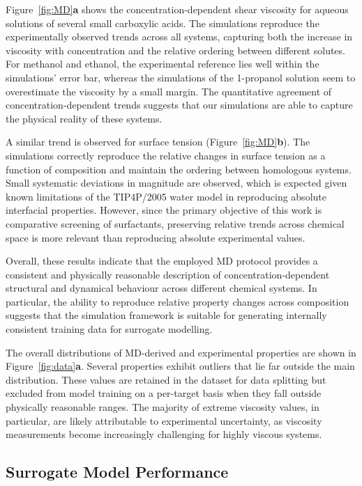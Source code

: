 \documentclass[letterpaper]{article}
\begin{document}
Figure~\ref{fig:MD}\textbf{a} shows the concentration-dependent shear viscosity for aqueous solutions of several small carboxylic acids. The simulations reproduce the experimentally observed trends across all systems, capturing both the increase in viscosity with concentration and the relative ordering between different solutes. For methanol and ethanol, the experimental reference lies well within the simulations' error bar, whereas the simulations of the 1-propanol solution seem to overestimate the viscosity by a small margin. The quantitative agreement of concentration-dependent trends suggests that our simulations are able to capture the physical reality of these systems.

A similar trend is observed for surface tension (Figure~\ref{fig:MD}\textbf{b}). The simulations correctly reproduce the relative changes in surface tension as a function of composition and maintain the ordering between homologous systems. Small systematic deviations in magnitude are observed, which is expected given known limitations of the TIP4P/2005 water model in reproducing absolute interfacial properties. However, since the primary objective of this work is comparative screening of surfactants, preserving relative trends across chemical space is more relevant than reproducing absolute experimental values.

Overall, these results indicate that the employed MD protocol provides a consistent and physically reasonable description of concentration-dependent structural and dynamical behaviour across different chemical systems. In particular, the ability to reproduce relative property changes across composition suggests that the simulation framework is suitable for generating internally consistent training data for surrogate modelling.

The overall distributions of MD-derived and experimental properties are shown in Figure~\ref{fig:data}\textbf{a}. Several properties exhibit outliers that lie far outside the main distribution. These values are retained in the dataset for data splitting but excluded from model training on a per-target basis when they fall outside physically reasonable ranges. The majority of extreme viscosity values, in particular, are likely attributable to experimental uncertainty, as viscosity measurements become increasingly challenging for highly viscous systems.


\subsection{Surrogate Model Performance}
\end{document}
